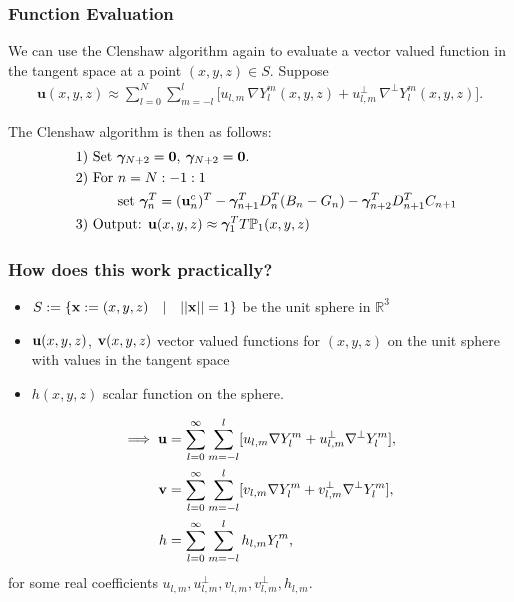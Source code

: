 \documentclass[10pt]{beamer}
\newcommand{\R}{\mathbb{R}}
\newcommand{\Ylm}{Y^m_l}
\newcommand{\gradP}{T\mathbb{P}}
\newcommand{\gradYlm}{\nabla Y^m_l}
\newcommand{\gradpYlm}{\nabla^\perp Y^m_l}
\begin{document}
\frame
{
    \frametitle{Function Evaluation}
    
We can use the Clenshaw algorithm again to evaluate a vector valued function in the tangent space at a point $(x,y,z) \in S$. Suppose
\begin{align}
\mathbf{u}(x,y,z) \approx \sum^N_{l=0} \sum^l_{m=-l} \big[u_{l,m} \, \gradYlm(x,y,z)  + u^\perp_{l,m} \, \gradpYlm(x,y,z) \big].
\end{align}

The Clenshaw algorithm is then as follows:
\begin{align*}
\quad &\text{1) } \text{Set } \bm{\gamma}_{N+2} = \bold{0}, \: \bm{\gamma}_{N+2} = \bold{0}. \\
\quad &\text{2) } \text{For } n = N:-1:1 \\
\quad & \quad \quad \quad \text{set } \bm{\gamma}_{n}^T = (\mathbf{u}^c_n)^T - \bm{\gamma}_{n+1}^T D^T_n (B_n - G_n) -  \bm{\gamma}_{n+2}^T D^T_{n+1}C_{n+1} \\
\quad &\text{3) } \text{Output: } \mathbf{u}(x,y,z) \approx \bm{\gamma}_{1}^T \gradP_1(x,y,z)
\end{align*}

}

\frame
{
    \frametitle{How does this work practically?}

\begin{itemize}

\item \(S := \{ \bold{x} := (x,y,z) \quad | \quad ||\bold{x}|| = 1\}\) be the unit sphere in \(\R^3\)

\item \(\bold{u}(x,y,z)\), \(\bold{v}(x,y,z)\) vector valued functions for \((x,y,z)\) on the unit sphere with values in the tangent space 

\item \(h(x,y,z)\) scalar function on the sphere.

\end{itemize}

\begin{align}
\implies \bold{u} &= \sum_{l=0}^{\infty} \sum_{m=-l}^{l} [ u_{l,m} \gradYlm + u^{\perp}_{l,m} \gradpYlm ], \\
\bold{v} &= \sum_{l=0}^{\infty} \sum_{m=-l}^{l} [ v_{l,m} \gradYlm + v^{\perp}_{l,m} \gradpYlm ], \\
h &= \sum_{l=0}^{\infty} \sum_{m=-l}^{l} h_{l,m} \Ylm,
\end{align}
for some real coefficients \(u_{l,m}, u^{\perp}_{l,m}, v_{l,m}, v^{\perp}_{l,m}, h_{l,m}\). 

}
\end{document}
